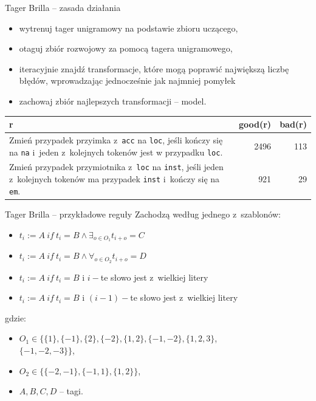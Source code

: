 \documentclass[xcolor=dvipsnames,polish]{beamer}
\begin{document}
\begin{frame}{Tager Brilla -- zasada działania}
\begin{itemize}
  \item wytrenuj tager unigramowy na podstawie zbioru uczącego,
  \item otaguj zbiór rozwojowy za pomocą tagera unigramowego,
  \item iteracyjnie znajdź transformacje, które mogą poprawić największą liczbę błędów, wprowadzając jednocześnie jak najmniej pomyłek
  \item zachowaj zbiór najlepszych transformacji -- model.
\end{itemize}
\begin{tabular}{p{8cm}|r|r}
r & good(r) & bad(r) \\ \hline
Zmień przypadek przyimka z~\texttt{acc} na \texttt{loc}, jeśli kończy
się na \texttt{na} i~jeden z~kolejnych tokenów jest w przypadku
\texttt{loc}. & 2496 & 113 \\ \hline
Zmień przypadek przymiotnika z~\texttt{loc} na \texttt{inst}, jeśli jeden z~kolejnych tokenów ma przypadek \texttt{inst} i~kończy się na \texttt{em}. & 921 & 29 \\ \hline
\end{tabular}
\end{frame}

\begin{frame}{Tager Brilla -- przykładowe reguły}
Zachodzą według jednego z~szablonów:
\begin{itemize}
  \item $t_i := A\ if\ t_i = B \land \exists_{o \in O_1} t_{i+o} = C$
  \item $t_i := A\ if\ t_i = B \land \forall_{o \in O_2} t_{i+o} = D$
  \item $t_i := A\ if\ t_i = B$ i $i-$te słowo jest z~wielkiej litery
  \item $t_i := A\ if\ t_i = B$ i $(i-1)-$te słowo jest z~wielkiej litery
\end{itemize}
gdzie:
\begin{itemize}
  \item $O_1 \in \{\{1\}, \{-1\}, \{2\}, \{-2\}, \{1, 2\}, \{-1, -2\}, \{1, 2, 3\}$,\\
  $\{-1, -2, -3\}\}$,
  \item $O_2 \in \{\{-2, -1\}, \{-1, 1\}, \{1, 2\}\}$,
  \item $A, B, C, D$ -- tagi.
\end{itemize}
\end{frame}
\end{document}
